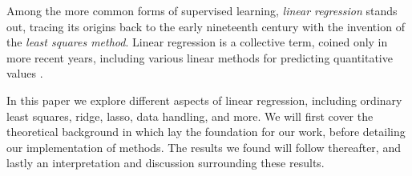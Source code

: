 Among the more common forms of supervised learning, \textit{linear regression} stands out, tracing its origins back to the early nineteenth century with the invention of the \textit{least squares method}. Linear regression is a collective term, coined only in more recent years, including various linear methods for predicting quantitative values \citep[ p.~5]{james}. 


In this paper we explore different aspects of linear regression, including ordinary least squares, ridge, lasso, data handling, and more. 
We will first cover the theoretical background in which lay the foundation for our work, before detailing our implementation of methods. 
The results we found will follow thereafter, and lastly an interpretation and discussion surrounding these results. 


